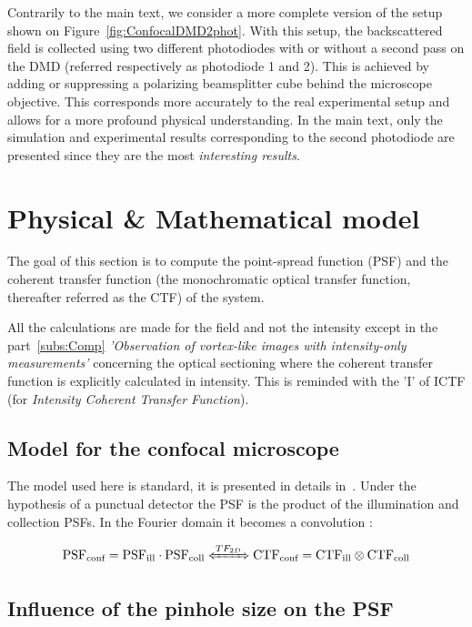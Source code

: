 \documentclass[%
reprint,
 amsmath,amssymb,
 aps,
]{revtex4-2}
\begin{document}
Contrarily to the main text, we consider a more complete version of the setup shown on Figure~\ref{fig:ConfocalDMD2phot}. With this setup, the backscattered field is collected using two different photodiodes with or without a second pass on the DMD (referred respectively as photodiode 1 and 2). This is achieved by adding or suppressing a polarizing beamsplitter cube behind the microscope objective. This corresponds more accurately to the real experimental setup and allows for a more profound physical understanding. In the main text, only the simulation and experimental results corresponding to the second photodiode are presented since they are the most \textit{interesting results}.

\section{Physical \& Mathematical model}

The goal of this section is to compute the point-spread function (PSF) and the coherent transfer function (the monochromatic optical transfer function, thereafter referred as the CTF) of the system.

All the calculations are made for the field and not the intensity except in the part~\ref{subs:Comp} \textit{'Observation of vortex-like images with intensity-only measurements'} concerning the optical sectioning where the coherent transfer function is explicitly calculated in intensity. This is reminded with the 'I' of ICTF (for \textit{Intensity Coherent Transfer Function}). 

\subsection{Model for the confocal microscope}

The model used here is standard, it is presented in details in~\cite{JMertz}. Under the hypothesis of a punctual detector the PSF is the product of the illumination and collection PSFs. In the Fourier domain it becomes a convolution :

\begin{equation}\label{PSFconf} %
    \textrm{PSF}_{\textrm{conf}}=\textrm{PSF}_{\textrm{ill}}\cdot \textrm{PSF}_{\textrm{coll}} \xLeftrightarrow{\large{TF_{2D}}} \textrm{CTF}_{\textrm{conf}}=\textrm{CTF}_{\textrm{ill}}\otimes \textrm{CTF}_{\textrm{coll}}
\end{equation}

\subsection{Influence of the pinhole size on the PSF}
\end{document}
